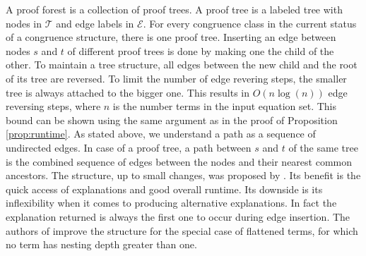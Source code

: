 A proof forest is a collection of proof trees.
A proof tree is a labeled tree with nodes in $\mathcal{T}$ and edge labels in $\mathcal{E}$.
For every congruence class in the current status of a congruence structure, there is one proof tree.
Inserting an edge between nodes $s$ and $t$ of different proof trees is done by making one the child of the other.
To maintain a tree structure, all edges between the new child and the root of its tree are reversed.
To limit the number of edge revering steps, the smaller tree is always attached to the bigger one.
This results in $O(n \log(n))$ edge reversing steps, where $n$ is the number terms in the input equation set.
This bound can be shown using the same argument as in the proof of Proposition \ref{prop:runtime}.
As stated above, we understand a path as a sequence of undirected edges.
In case of a proof tree, a path between $s$ and $t$ of the same tree is the combined sequence of edges between the nodes and their nearest common ancestors.
The structure, up to small changes, was proposed by \cite{Nieuwenhuis2005,Nieuwenhuis2007}.
Its benefit is the quick access of explanations and good overall runtime.
Its downside is its inflexibility when it comes to producing alternative explanations.
In fact the explanation returned is always the first one to occur during edge insertion.
The authors of \cite{Nieuwenhuis2005,Nieuwenhuis2007} improve the structure for the special case of flattened terms, for which no term has nesting depth greater than one.






